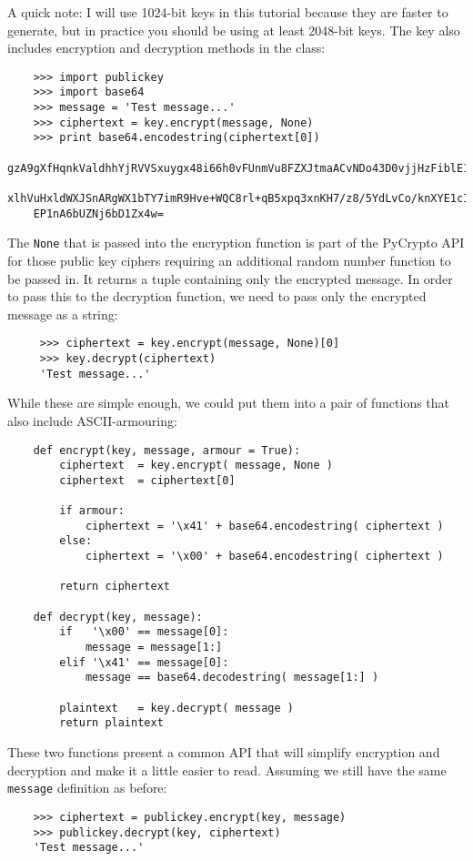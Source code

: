 \documentclass[letterpaper,10pt]{article}
\begin{document}
A quick note: I will use 1024-bit keys in this tutorial because they are 
faster to generate, but in practice you should be using at least 2048-bit 
keys. The key also includes encryption and decryption methods in the class:
\begin{verbatim}    
    >>> import publickey
    >>> import base64
    >>> message = 'Test message...'
    >>> ciphertext = key.encrypt(message, None)
    >>> print base64.encodestring(ciphertext[0])
    gzA9gXfHqnkValdhhYjRVVSxuygx48i66h0vFUnmVu8FZXJtmaACvNDo43D0vjjHzFiblE1eCFiI
    xlhVuHxldWXJSnARgWX1bTY7imR9Hve+WQC8rl+qB5xpq3xnKH7/z8/5YdLvCo/knXYE1cI/XYJP
    EP1nA6bUZNj6bD1Zx4w=
\end{verbatim}

The \texttt{None} that is passed into the encryption function is part of the 
PyCrypto API for those public key ciphers requiring an additional random number 
function to be passed in. It returns a tuple containing only the encrypted 
message. In order to pass this to the decryption function, we need to pass only 
the encrypted message as a string:
\begin{verbatim}
     >>> ciphertext = key.encrypt(message, None)[0]
     >>> key.decrypt(ciphertext)
     'Test message...'
\end{verbatim}

While these are simple enough, we could put them into a pair of functions that
also include ASCII-armouring:
\begin{verbatim}
    def encrypt(key, message, armour = True):
        ciphertext  = key.encrypt( message, None )
        ciphertext  = ciphertext[0]

        if armour:
            ciphertext = '\x41' + base64.encodestring( ciphertext )
        else:
            ciphertext = '\x00' + base64.encodestring( ciphertext )

        return ciphertext

    def decrypt(key, message):
        if   '\x00' == message[0]:
            message = message[1:]
        elif '\x41' == message[0]:
            message == base64.decodestring( message[1:] )

        plaintext   = key.decrypt( message )
        return plaintext
\end{verbatim}

These two functions present a common API that will simplify encryption and
decryption and make it a little easier to read. Assuming we still have the same
\texttt{message} definition as before:
\begin{verbatim}
    >>> ciphertext = publickey.encrypt(key, message)
    >>> publickey.decrypt(key, ciphertext)
    'Test message...'
\end{verbatim}
\end{document}
